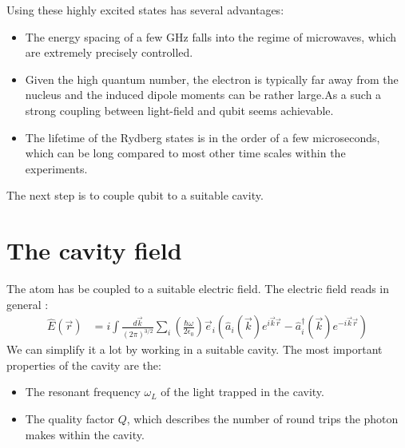 \documentclass[10pt]{article}
\let\cite\citep
\providecommand\citep{\cite}
\begin{document}
Using these highly excited states has several advantages:
\begin{itemize}
\item The energy spacing of a few GHz falls into the regime of microwaves, which are extremely precisely controlled.
\item Given the high quantum number, the electron is typically far away from the nucleus and the induced dipole moments can be rather large.As a such a strong coupling between light-field and qubit seems achievable.
\item The lifetime of the Rydberg states is in the order of a few microseconds, which can be long compared to most other time scales within the experiments.
\end{itemize}

The next step is to couple qubit to a suitable cavity.



\section{The cavity field}
The atom has be coupled to a suitable electric field. The electric field reads in general \cite{field}:
\begin{align}
\hat{E}(\vec{r})&= i \int \frac{d\vec{k}}{(2\pi)^{3/2}}\sum_i \left(\frac{\hbar\omega}{2\epsilon_0}\right)\vec{e}_i\left(\hat{a}_i(\vec{k})e^{i\vec{k}\vec{r}}-\hat{a}^\dag_i(\vec{k})e^{-i\vec{k}\vec{r}}\right)
\end{align}
We can simplify it a lot by working in a suitable cavity. The most important properties of the cavity are the:
\begin{itemize}
\item The resonant frequency $\omega_L$ of the light trapped in the cavity.
\item  The quality factor $Q$, which describes the number of round trips the photon makes within the cavity.
\end{itemize}
\end{document}
